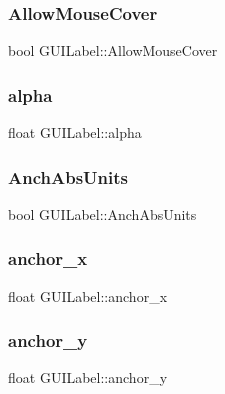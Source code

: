 \subsubsection{\texorpdfstring{Allow\+Mouse\+Cover}{AllowMouseCover}}
{\footnotesize\ttfamily bool G\+U\+I\+Label\+::\+Allow\+Mouse\+Cover}

\hypertarget{class_g_u_i_label_a033d064957f88cd4ebcea6c483af6984}{}\label{class_g_u_i_label_a033d064957f88cd4ebcea6c483af6984} 
\subsubsection{\texorpdfstring{alpha}{alpha}}
{\footnotesize\ttfamily float G\+U\+I\+Label\+::alpha}

\hypertarget{class_g_u_i_label_a6f754a65fa615452fc29549dbec7e575}{}\label{class_g_u_i_label_a6f754a65fa615452fc29549dbec7e575} 
\subsubsection{\texorpdfstring{Anch\+Abs\+Units}{AnchAbsUnits}}
{\footnotesize\ttfamily bool G\+U\+I\+Label\+::\+Anch\+Abs\+Units}

\hypertarget{class_g_u_i_label_ad97ebfa0fe0d847ed8d576573f0ab2eb}{}\label{class_g_u_i_label_ad97ebfa0fe0d847ed8d576573f0ab2eb} 
\subsubsection{\texorpdfstring{anchor\+\_\+x}{anchor\_x}}
{\footnotesize\ttfamily float G\+U\+I\+Label\+::anchor\+\_\+x}

\hypertarget{class_g_u_i_label_a45ebaaf3cc0582852a4ad720756a0e9f}{}\label{class_g_u_i_label_a45ebaaf3cc0582852a4ad720756a0e9f} 
\subsubsection{\texorpdfstring{anchor\+\_\+y}{anchor\_y}}
{\footnotesize\ttfamily float G\+U\+I\+Label\+::anchor\+\_\+y}

